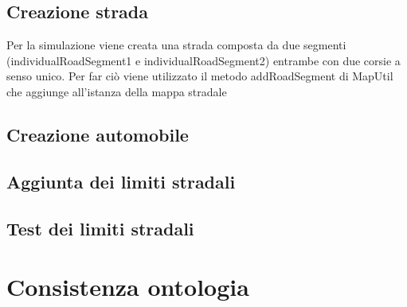\subsection{Creazione strada}
Per la simulazione viene creata una strada composta da due segmenti (individualRoadSegment1 e individualRoadSegment2) entrambe con due corsie a senso unico.
Per far ci\`o viene utilizzato il metodo addRoadSegment di MapUtil che aggiunge all'istanza della mappa stradale 
\subsection{Creazione automobile}
\subsection{Aggiunta dei limiti stradali}
\subsection{Test dei limiti stradali}

\section{Consistenza ontologia}


